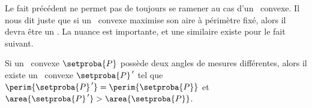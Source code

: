 \begin{remark}
	Le fait précédent ne permet pas de toujours se ramener au cas d'un \niso\ convexe. Il nous dit juste que si un \ngone\ convexe maximise son aire à périmètre fixé, alors il devra être un \niso. La nuance est importante, et une similaire existe pour le fait suivant.
\end{remark}




\begin{fact} \label{almost-reg-poly}
	Si un \niso\ convexe $\setproba{P}$ possède deux angles de mesures différentes,
	alors il existe un \ngone\ convexe $\setproba{P}^{\,\prime}$ tel que
	$\perim{\setproba{P}^{\,\prime}} = \perim{\setproba{P}}$ 
	et 
	$\area{\setproba{P}^{\,\prime}} > \area{\setproba{P}}$.
\end{fact}



